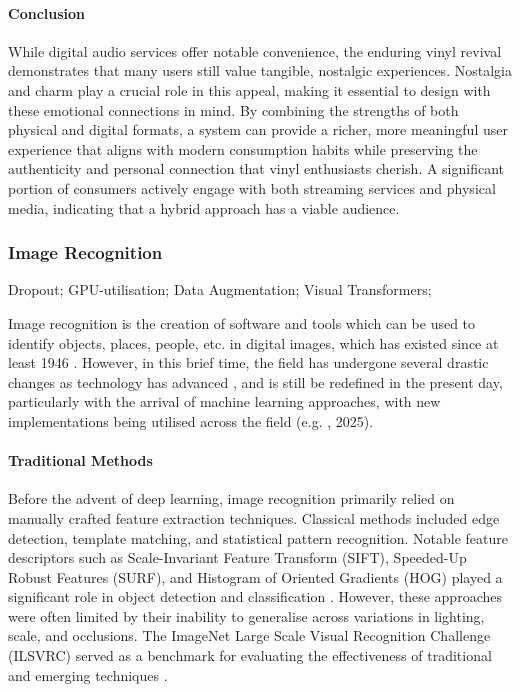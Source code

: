             \paragraph{Conclusion}
                While digital audio services offer notable convenience, the enduring vinyl revival demonstrates that many users still value tangible, nostalgic experiences. Nostalgia and charm play a crucial role in this appeal, making it essential to design with these emotional connections in mind. By combining the strengths of both physical and digital formats, a system can provide a richer, more meaningful user experience that aligns with modern consumption habits while preserving the authenticity and personal connection that vinyl enthusiasts cherish. A significant portion of consumers actively engage with both streaming services and physical media, indicating that a hybrid approach has a viable audience.
    
        \subsubsection{Image Recognition}
    
            \begin{temp}
                Dropout; GPU-utilisation; Data Augmentation; Visual Transformers; 
            \end{temp}
    
            Image recognition is the creation of software and tools which can be used to identify objects, places, people, etc. in digital images, which has existed since at least 1946 \cite{hall1979computer}. However, in this brief time, the field has undergone several drastic changes as technology has advanced \cite{imagenetclasscnn}, and is still be redefined in the present day, particularly with the arrival of machine learning approaches, with new implementations being utilised across the field (e.g. \cite{RAMPRASAD2025100556}, 2025).
    
            \paragraph{Traditional Methods}
            
                Before the advent of deep learning, image recognition primarily relied on manually crafted feature extraction techniques. Classical methods included edge detection, template matching, and statistical pattern recognition. Notable feature descriptors such as Scale-Invariant Feature Transform (SIFT), Speeded-Up Robust Features (SURF), and Histogram of Oriented Gradients (HOG) played a significant role in object detection and classification \cite{pal2001pattern}. However, these approaches were often limited by their inability to generalise across variations in lighting, scale, and occlusions. The ImageNet Large Scale Visual Recognition Challenge (ILSVRC) served as a benchmark for evaluating the effectiveness of traditional and emerging techniques \cite{russakovsky2015imagenetlargescalevisual}.
            
